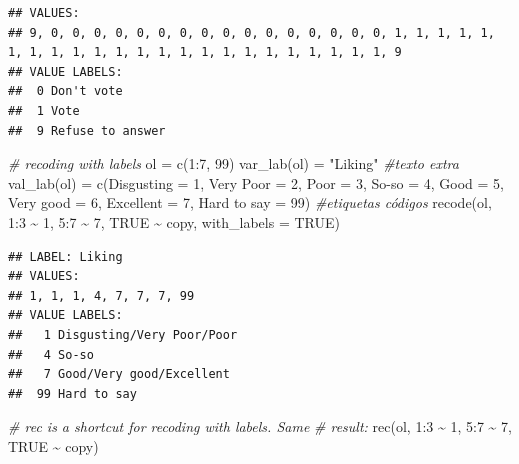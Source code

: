 \documentclass[
]{book}
\newenvironment{Shaded}{\begin{snugshade}}{\end{snugshade}}
\newcommand{\AttributeTok}[1]{\textcolor[rgb]{0.77,0.63,0.00}{#1}}
\newcommand{\CommentTok}[1]{\textcolor[rgb]{0.56,0.35,0.01}{\textit{#1}}}
\newcommand{\ConstantTok}[1]{\textcolor[rgb]{0.00,0.00,0.00}{#1}}
\newcommand{\DecValTok}[1]{\textcolor[rgb]{0.00,0.00,0.81}{#1}}
\newcommand{\FunctionTok}[1]{\textcolor[rgb]{0.00,0.00,0.00}{#1}}
\newcommand{\NormalTok}[1]{#1}
\newcommand{\OtherTok}[1]{\textcolor[rgb]{0.56,0.35,0.01}{#1}}
\newcommand{\SpecialCharTok}[1]{\textcolor[rgb]{0.00,0.00,0.00}{#1}}
\newcommand{\StringTok}[1]{\textcolor[rgb]{0.31,0.60,0.02}{#1}}
\begin{document}
\begin{verbatim}
## VALUES:
## 9, 0, 0, 0, 0, 0, 0, 0, 0, 0, 0, 0, 0, 0, 0, 0, 0, 1, 1, 1, 1, 1, 1, 1, 1, 1, 1, 1, 1, 1, 1, 1, 1, 1, 1, 1, 1, 1, 1, 1, 9
## VALUE LABELS:                   
##  0 Don't vote      
##  1 Vote            
##  9 Refuse to answer
\end{verbatim}

\begin{Shaded}
\begin{Highlighting}[]
\CommentTok{\# recoding with labels}
\NormalTok{ol }\OtherTok{=} \FunctionTok{c}\NormalTok{(}\DecValTok{1}\SpecialCharTok{:}\DecValTok{7}\NormalTok{, }\DecValTok{99}\NormalTok{)}
\FunctionTok{var\_lab}\NormalTok{(ol) }\OtherTok{=} \StringTok{"Liking"}  \CommentTok{\#texto extra}
\FunctionTok{val\_lab}\NormalTok{(ol) }\OtherTok{=} \FunctionTok{c}\NormalTok{(}\AttributeTok{Disgusting =} \DecValTok{1}\NormalTok{, }\StringTok{\textasciigrave{}}\AttributeTok{Very Poor}\StringTok{\textasciigrave{}} \OtherTok{=} \DecValTok{2}\NormalTok{, }\AttributeTok{Poor =} \DecValTok{3}\NormalTok{, }
  \StringTok{\textasciigrave{}}\AttributeTok{So{-}so}\StringTok{\textasciigrave{}} \OtherTok{=} \DecValTok{4}\NormalTok{, }\AttributeTok{Good =} \DecValTok{5}\NormalTok{, }\StringTok{\textasciigrave{}}\AttributeTok{Very good}\StringTok{\textasciigrave{}} \OtherTok{=} \DecValTok{6}\NormalTok{, }\AttributeTok{Excellent =} \DecValTok{7}\NormalTok{, }
  \StringTok{\textasciigrave{}}\AttributeTok{Hard to say}\StringTok{\textasciigrave{}} \OtherTok{=} \DecValTok{99}\NormalTok{)  }\CommentTok{\#etiquetas códigos}
\FunctionTok{recode}\NormalTok{(ol, }\DecValTok{1}\SpecialCharTok{:}\DecValTok{3} \SpecialCharTok{\textasciitilde{}} \DecValTok{1}\NormalTok{, }\DecValTok{5}\SpecialCharTok{:}\DecValTok{7} \SpecialCharTok{\textasciitilde{}} \DecValTok{7}\NormalTok{, }\ConstantTok{TRUE} \SpecialCharTok{\textasciitilde{}}\NormalTok{ copy, }\AttributeTok{with\_labels =} \ConstantTok{TRUE}\NormalTok{)}
\end{Highlighting}
\end{Shaded}

\begin{verbatim}
## LABEL: Liking 
## VALUES:
## 1, 1, 1, 4, 7, 7, 7, 99
## VALUE LABELS:                             
##   1 Disgusting/Very Poor/Poor
##   4 So-so                    
##   7 Good/Very good/Excellent 
##  99 Hard to say
\end{verbatim}

\begin{Shaded}
\begin{Highlighting}[]
\CommentTok{\# \textquotesingle{}rec\textquotesingle{} is a shortcut for recoding with labels. Same}
\CommentTok{\# result:}
\FunctionTok{rec}\NormalTok{(ol, }\DecValTok{1}\SpecialCharTok{:}\DecValTok{3} \SpecialCharTok{\textasciitilde{}} \DecValTok{1}\NormalTok{, }\DecValTok{5}\SpecialCharTok{:}\DecValTok{7} \SpecialCharTok{\textasciitilde{}} \DecValTok{7}\NormalTok{, }\ConstantTok{TRUE} \SpecialCharTok{\textasciitilde{}}\NormalTok{ copy)}
\end{Highlighting}
\end{Shaded}
\end{document}
